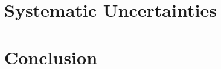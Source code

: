 \documentclass{cmspaper}
\begin{document}
\section{Systematic Uncertainties}
\label{sec:systematics}



\section{Conclusion}
\label{sec:conclusion}




%

\appendix
\appendixpage
\end{document}
